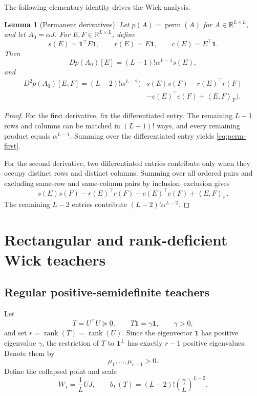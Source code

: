 \documentclass[11pt]{article}
\newtheorem{lemma}[theorem]{Lemma}
\newcommand{\R}{\mathbb{R}}
\newcommand{\one}{\mathbf{1}}
\newcommand{\perm}{\operatorname{perm}}
\newcommand{\rank}{\operatorname{rank}}
\newcommand{\ip}[2]{\left\langle #1,#2\right\rangle}
\newcommand{\F}{\mathrm{F}}
\begin{document}
The following elementary identity drives the Wick analysis.

\begin{lemma}[Permanent derivatives]
\label{lem:permanent-derivatives}
Let $p(A)=\perm(A)$ for $A\in\R^{L\times L}$, and let $A_0=\alpha J$.  For $E,F\in\R^{L\times L}$, define
\[
s(E)=\one^\top E\one,\qquad r(E)=E\one,\qquad c(E)=E^\top\one.
\]
Then
\begin{equation}
Dp(A_0)[E]=(L-1)!\alpha^{L-1}s(E),
\label{eq:perm-first}
\end{equation}
and
\begin{align}
D^2p(A_0)[E,F]
=(L-2)!\alpha^{L-2}\bigl(&s(E)s(F)-r(E)^\top r(F)\nonumber\\
&-c(E)^\top c(F)+\ip{E}{F}_{\F}\bigr).
\label{eq:perm-second}
\end{align}
\end{lemma}

\begin{proof}
For the first derivative, fix the differentiated entry.  The remaining $L-1$ rows and columns can be matched in $(L-1)!$ ways, and every remaining product equals $\alpha^{L-1}$.  Summing over the differentiated entry yields \eqref{eq:perm-first}.

For the second derivative, two differentiated entries contribute only when they occupy distinct rows and distinct columns.  Summing over all ordered pairs and excluding same-row and same-column pairs by inclusion--exclusion gives
\[
s(E)s(F)-r(E)^\top r(F)-c(E)^\top c(F)+\ip{E}{F}_{\F}.
\]
The remaining $L-2$ entries contribute $(L-2)!\alpha^{L-2}$.
\end{proof}

\section{Rectangular and rank-deficient Wick teachers}

\subsection{Regular positive-semidefinite teachers}

Let
\begin{equation}
T=U^\top U\succeq0,
\qquad T\one=\gamma\one,
\qquad \gamma>0,
\label{eq:regular-psd}
\end{equation}
and set $r=\rank(T)=\rank(U)$.  Since the eigenvector $\one$ has positive eigenvalue $\gamma$, the restriction of $T$ to $\one^\perp$ has exactly $r-1$ positive eigenvalues.  Denote them by
\[
\mu_1,\ldots,\mu_{r-1}>0.
\]
Define the collapsed point and scale
\begin{equation}
W_\star=\frac1L UJ,
\qquad
b_L(T)=(L-2)!\left(\frac{\gamma}{L}\right)^{L-2}.
\label{eq:wick-collapsed-scale}
\end{equation}
\end{document}
